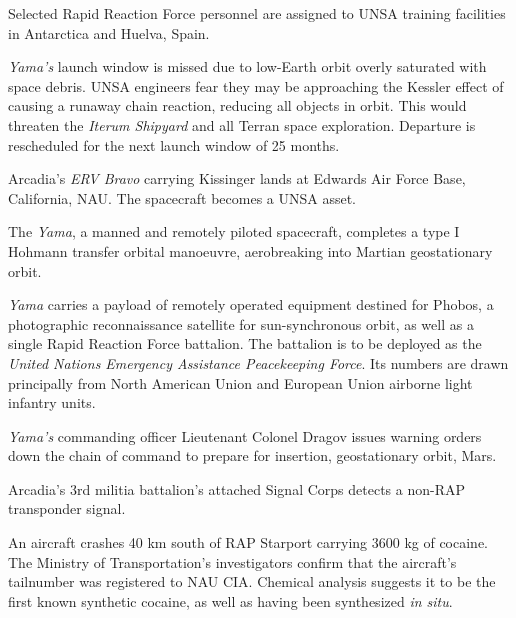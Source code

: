 Selected Rapid Reaction Force personnel are assigned to UNSA training facilities in Antarctica and Huelva, Spain.
\StopTimelineDate

{\it Yama's} launch window is missed due to low-Earth orbit overly saturated with space debris. UNSA engineers fear they may be approaching the Kessler effect of causing a runaway chain reaction, reducing all objects in orbit. This would threaten the {\it Iterum Shipyard} and all Terran space exploration. Departure is rescheduled for the next launch window of 25 months.
\StopTimelineDate

Arcadia's {\it ERV Bravo} carrying Kissinger lands at Edwards Air Force Base, California, NAU. The spacecraft becomes a UNSA asset.
\StopTimelineDate

The {\it Yama}, a manned and remotely piloted spacecraft, completes a type I Hohmann transfer orbital manoeuvre, aerobreaking into Martian geostationary orbit. 

{\it Yama} carries a payload of remotely operated equipment destined for Phobos, a photographic reconnaissance satellite for sun-synchronous orbit, as well as a single Rapid Reaction Force battalion. The battalion is to be deployed as the {\it United Nations Emergency Assistance Peacekeeping Force}. Its numbers are drawn principally from North American Union and European Union airborne light infantry units.
\StopTimelineDate

{\it Yama's} commanding officer Lieutenant Colonel Dragov issues warning orders down the chain of command to prepare for insertion, geostationary orbit, Mars.
\StopTimelineDate

Arcadia's 3rd militia battalion's attached Signal Corps detects a non-RAP transponder signal.
\StopTimelineDate

An aircraft crashes 40 km south of RAP Starport carrying 3600 kg of cocaine. The Ministry of Transportation's investigators confirm that the aircraft's tailnumber was registered to NAU CIA. Chemical analysis suggests it to be the first known synthetic cocaine, as well as having been synthesized {\it in situ}.
\StopTimelineDate

\stoplines

\StopChapter

